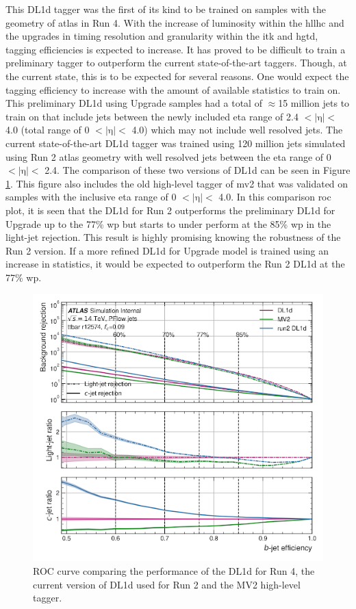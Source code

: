 This DL1d tagger was the first of its kind to be trained on samples with the geometry of \gls{atlas} in Run 4. With the increase of luminosity within the \gls{hllhc} and the upgrades in timing 
resolution and granularity within the \gls{itk} and \gls{hgtd}, tagging efficiencies is expected to increase. It has proved to be difficult to train a preliminary tagger to outperform the current 
state-of-the-art taggers. Though, at the current state, this is to be expected for several reasons. One would expect the tagging efficiency to increase with the amount of available statistics to train on.
This preliminary DL1d using Upgrade samples had a total of $\approx$15 million jets to train on that include jets between the newly included eta range of 2.4 $<|\textrm{η}|<$ 4.0 (total range of 0 $<|\textrm{η}|<$ 4.0) 
which may not include well resolved jets. The current state-of-the-art DL1d tagger was trained using 120 million jets simulated using Run 2 \gls{atlas} geometry with well resolved jets between the 
eta range of  0 $<|\textrm{η}|<$ 2.4. The comparison of these two versions of DL1d can be seen in Figure \ref{fig:dl1d-mv2-comp}. This figure also includes the old high-level tagger of \gls{mv2} that was validated on 
samples with the inclusive eta range of 0 $<|\textrm{η}|<$ 4.0. In this comparison \gls{roc} plot, it is seen that the DL1d for Run 2 outperforms the preliminary DL1d for Upgrade up to the 77\% \gls{wp} but starts to under perform at the 85\% \gls{wp} in the light-jet rejection. This result is highly promising knowing the robustness of the Run 2 version. If a more refined DL1d for Upgrade model is trained using 
an increase in statistics, it would be expected to outperform the Run 2 DL1d at the 77\% \gls{wp}.

\begin{figure}[h]
    \centering
    \includegraphics[scale=0.75]{figs/ch5/rejveff_mv2.png}
    \caption{ ROC curve comparing the performance of the DL1d for Run 4, the current version of DL1d used for Run 2 and the MV2 high-level tagger.}
\label{fig:dl1d-mv2-comp}
\end{figure}

